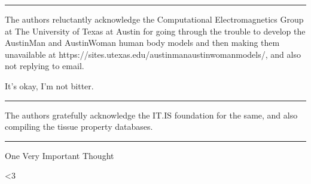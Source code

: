 \documentclass[paper.tex]{subfiles}
\begin{document}
\rule{\linewidth}{0.2pt}

The authors reluctantly acknowledge the Computational Electromagnetics Group at The University of Texas at Austin for going through the trouble to develop the AustinMan and AustinWoman human body models and then making them unavailable at https://sites.utexas.edu/austinmanaustinwomanmodels/, and also not replying to email. 

It's okay, I'm not bitter.

\rule{\linewidth}{0.2pt}

The authors gratefully acknowledge the IT.IS foundation for the same, and also compiling the tissue property databases.

\rule{\linewidth}{0.2pt}

One Very Important Thought


{\Large {\verbatim <3}}
\end{document}
